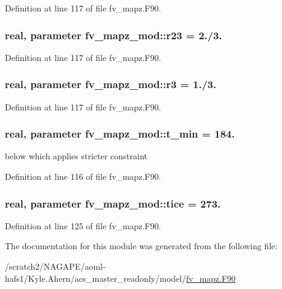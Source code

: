 Definition at line 117 of file fv\-\_\-mapz.\-F90.

\subsubsection[{r23}]{\setlength{\rightskip}{0pt plus 5cm}real, parameter fv\-\_\-mapz\-\_\-mod\-::r23 = 2./3.}\label{classfv__mapz__mod_a24b67f915ffc43180f28b980d9ca7d4c}


Definition at line 117 of file fv\-\_\-mapz.\-F90.

\subsubsection[{r3}]{\setlength{\rightskip}{0pt plus 5cm}real, parameter fv\-\_\-mapz\-\_\-mod\-::r3 = 1./3.}\label{classfv__mapz__mod_a85ad5e9000a3d762fd9a62ce59fa9213}


Definition at line 117 of file fv\-\_\-mapz.\-F90.

\subsubsection[{t\-\_\-min}]{\setlength{\rightskip}{0pt plus 5cm}real, parameter fv\-\_\-mapz\-\_\-mod\-::t\-\_\-min = 184.}\label{classfv__mapz__mod_a7cf7f37723bbfb2e7d6b4d948ea81567}


below which applies stricter constraint 



Definition at line 116 of file fv\-\_\-mapz.\-F90.

\subsubsection[{tice}]{\setlength{\rightskip}{0pt plus 5cm}real, parameter fv\-\_\-mapz\-\_\-mod\-::tice = 273.}\label{classfv__mapz__mod_a79c88aa388441e010f8532f6802b3240}


Definition at line 125 of file fv\-\_\-mapz.\-F90.



The documentation for this module was generated from the following file\-:\begin{DoxyCompactItemize}
\item 
/scratch2/\-N\-A\-G\-A\-P\-E/aoml-\/hafs1/\-Kyle.\-Ahern/acs\-\_\-master\-\_\-readonly/model/\hyperlink{fv__mapz_8F90}{fv\-\_\-mapz.\-F90}\end{DoxyCompactItemize}

